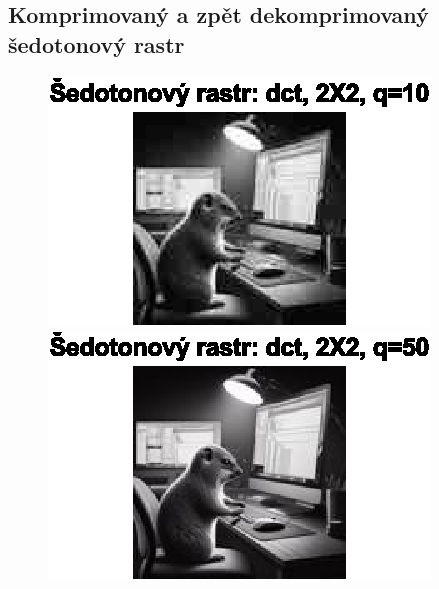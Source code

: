 
\subsection*{Komprimovaný a zpět dekomprimovaný šedotonový rastr}
\begin{figure}[H]
    \centering
    \begin{minipage}[b]{0.3\textwidth}
        \centering
        \includegraphics[width=\textwidth]{images/sedo_dct_2X2_q10.eps}
    \end{minipage}
    \hfill
    \begin{minipage}[b]{0.3\textwidth}
        \centering
        \includegraphics[width=\textwidth]{images/sedo_dct_2X2_q50.eps}
    \end{minipage}
    \hfill
    \begin{minipage}[b]{0.3\textwidth}
        \centering

\end{minipage}
\end{figure}
